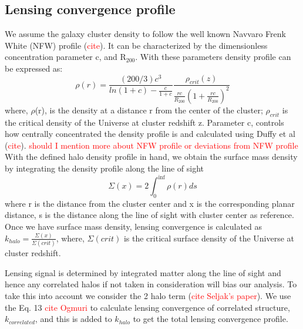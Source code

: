 \documentclass[twocolumn]{aastex61}
\newcommand{\pending}[1]{\textcolor{red}{#1}}
\begin{document}
\subsection{Lensing convergence profile}
We assume the galaxy cluster density to follow the well known Navvaro Frenk White (NFW) profile (\pending{cite}). It can be characterized by the dimensionless concentration parameter c, and R$_{200}$. With these parameters density profile can be expressed as:
\begin{equation}
\rho(r) = \frac{(200/3)c^{3}}{ln(1+c)-\frac{c}{1+c}} \frac{\rho_{crit}(z)}{\frac{rc}{R_{200}}(1+\frac{rc}{R_200})^{2}}
\end{equation}
where, $\rho$(r), is the density at a distance r from the center of the cluster; $\rho_{crit}$ is the critical density of the Universe at cluster redshift z. Parameter c, controls how centrally concentrated the density profile is and calculated using Duffy et al (\pending{cite}). 
\pending{should I mention more about NFW profile or deviations from NFW profile}
With the defined halo density profile in hand, we obtain the surface mass density by integrating the density profile along the line of sight
\begin{equation}
\Sigma(x) = 2 \int_{0}^{\inf} \rho(r) ds
\end{equation}
where r is the distance from the cluster center and x is the corresponding planar distance, s is the distance along the line of sight with cluster center as reference. Once we have surface mass density, lensing convergence is calculated as $k_{halo} = \frac{\Sigma(x)}{\Sigma(crit)}$, where, $\Sigma(crit)$ is the critical surface density of the Universe at cluster redshift.

Lensing signal is determined by integrated matter along the line of sight and hence any correlated halos if not taken in consideration will bias our analysis. To take this into account we consider the 2 halo term (\pending{cite Seljak's paper}). We use the Eq. 13 \pending{cite Ogmuri} to calculate lensing convergence of correlated structure, $k_{correlated}$, and this is added to $k_{halo}$ to get the total lensing convergence profile. 
\end{document}

